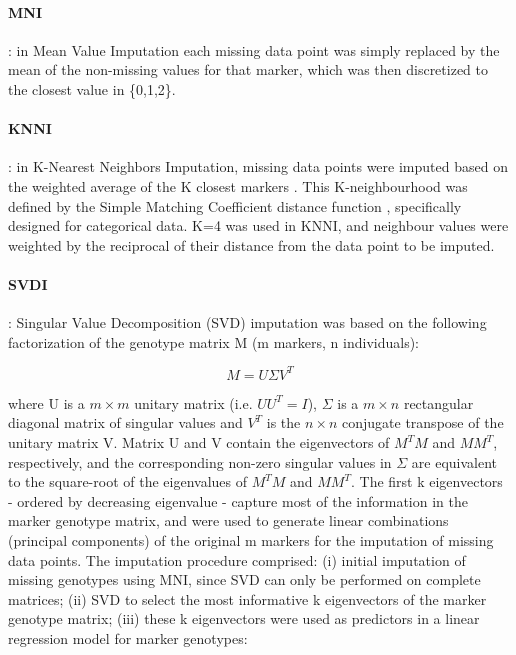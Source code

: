 \paragraph{MNI}
\label{par:MNI}
: in Mean Value Imputation each missing data point was simply replaced by the mean of the non-missing values for that marker, which was then discretized to the closest value in \{0,1,2\}. 
\paragraph{KNNI}
\label{par:KNNI}
: in K-Nearest Neighbors Imputation, missing data points were imputed based on the weighted average of the K closest markers \cite{troyanskaya_missing_2001}. This K-neighbourhood was defined by the Simple Matching Coefficient distance function \cite{schwender_statistical_2007}, specifically designed for categorical data. K=4 was used in KNNI, and neighbour values were weighted by the reciprocal of their distance from the data point to be imputed.
\paragraph{SVDI}
\label{par:SVDI}
: Singular Value Decomposition (SVD) imputation was based on the following factorization of the genotype matrix M (m markers, n individuals):

\begin{equation}
\label{eq:SVDI_general}
M = U\Sigma V^{T}
\end{equation}

where U is a $m \times m$ unitary matrix (i.e. $UU^{T}=I$), $\Sigma$ is a $m \times n$ rectangular diagonal matrix of singular values and $V^{T}$ is the $n \times n$ conjugate transpose of the unitary matrix V. Matrix U and V contain the eigenvectors of $M^{T}M$ and $MM^{T}$, respectively, and the corresponding non-zero singular values in $\Sigma$ are equivalent to the square-root of the eigenvalues of $M^{T}M$ and $MM^{T}$. The first k eigenvectors - ordered by decreasing eigenvalue - capture most of the information in the marker genotype matrix, and were used to generate linear combinations (principal components) of the original m markers for the imputation of missing data points. The imputation procedure comprised: (i) initial imputation of missing genotypes using MNI, since SVD can only be performed on complete matrices; (ii) SVD to select the most informative k eigenvectors of the marker genotype matrix; (iii) these k eigenvectors were used as predictors in a linear regression model for marker genotypes:

